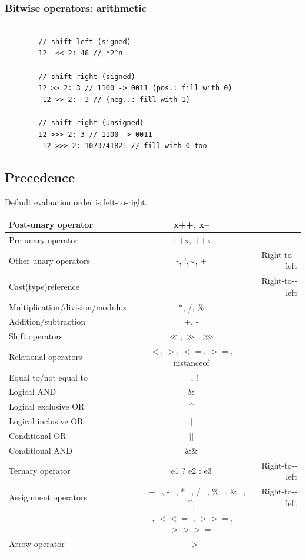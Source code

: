 \documentclass{scrartcl}
\begin{document}
\subsubsection{Bitwise operators: arithmetic}
    \begin{lstlisting}

        // shift left (signed)
        12  << 2: 48 // *2^n

        // shift right (signed)
        12 >> 2: 3 // 1100 -> 0011 (pos.: fill with 0)
        -12 >> 2: -3 // (neg..: fill with 1)

        // shift right (unsigned)
        12 >>> 2: 3 // 1100 -> 0011
        -12 >>> 2: 1073741821 // fill with 0 too
    \end{lstlisting}

\subsection{Precedence}

    Default evaluation order is left-to-right.

    \begin{tabular}{|l|c|r|}
        \hline
        Post-­unary operator& x++, x-- &  \\
        \hline
        Pre-­unary operator& ++x, ++x &  \\
        \hline
        Other unary operators& -­, !,$\sim$, + &  Right-­to-­left \\
        \hline
        Cast(type)reference&  &  Right-­to-­left \\
        \hline
        Multiplication/division/modulus& *, /, \% &  \\
        \hline
        Addition/subtraction& +, - &  \\
        \hline
        Shift operators& $\ll, \gg, \ggg$ &  \\
        \hline
        Relational operators & $<$, $>$, $<=$, $>=$, instanceof & \\
        \hline
        Equal to/not equal to& ==, != &\\
        \hline
        Logical AND& \& &  \\
        \hline
        Logical exclusive OR& \textasciicircum \\
        \hline
        Logical inclusive OR& $|$ &  \\
        \hline
        Conditional OR& $||$ &  \\
        \hline
        Conditional AND& \&\& &  \\
        \hline
        Ternary operator& e1 ? e2 : e3 & Right-­to-­left\\
        \hline
        Assignment operators& =, +=, -­=, *=, /=, \%=, \&=, \textasciicircum, & Right-­to-­left\\
        & $|$, $<<=$ , $>>=$, $>>>=$ & \\
        \hline
        Arrow operator& $->$ &  \\\\
        \hline
    \end{tabular}
     \\
\end{document}
